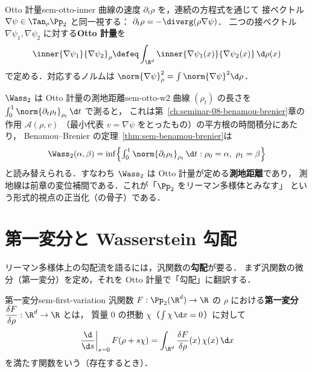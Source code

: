 \begin{definition}{Otto 計量}{sem-otto-inner}
  曲線の速度 $\partial_t\rho$ を，連続の方程式を通じて
  接ベクトル $\nabla\psi\in\Tan_\rho\Pp_2$ と同一視する：
  $\partial_t\rho=-\diverg(\rho\nabla\psi)$．
  二つの接ベクトル $\nabla\psi_1,\nabla\psi_2$ に対する\textbf{Otto 計量}を
  \[
    \inner{\nabla\psi_1}{\nabla\psi_2}_\rho
    \defeq
    \int_{\R^d}\inner{\nabla\psi_1(x)}{\nabla\psi_2(x)}\,\d\rho(x)
  \]
  で定める．対応するノルムは $\norm{\nabla\psi}_\rho^2=\int\norm{\nabla\psi}^2\d\rho$．
\end{definition}

\begin{remark}{$\Wass_2$ は Otto 計量の測地距離}{sem-otto-w2}
  曲線 $(\rho_t)$ の長さを $\int_0^1\norm{\partial_t\rho_t}_{\rho_t}\,\d t$ で測ると，
  これは第~\ref{ch:seminar-08-benamou-brenier}章の作用 $\mathcal{A}(\rho,v)$
  （最小代表 $v=\nabla\psi$ をとったもの）の平方根の時間積分にあたり，
  Benamou--Brenier の定理~\ref{thm:sem-benamou-brenier}は
  \[
    \Wass_2(\alpha,\beta)
    = \inf\Bigl\{\textstyle\int_0^1\norm{\partial_t\rho_t}_{\rho_t}\,\d t
      : \rho_0=\alpha,\ \rho_1=\beta\Bigr\}
  \]
  と読み替えられる．すなわち $\Wass_2$ は Otto 計量が定める\textbf{測地距離}であり，
  測地線は前章の変位補間である．これが「$\Pp_2$ をリーマン多様体とみなす」
  という形式的視点の正当化（の骨子）である．
\end{remark}

\section{第一変分と Wasserstein 勾配}
\label{sec:sem-w2-gradient}

リーマン多様体上の勾配流を語るには，汎関数の\textbf{勾配}が要る．
まず汎関数の微分（第一変分）を定め，それを Otto 計量で「勾配」に翻訳する．

\begin{definition}{第一変分}{sem-first-variation}
  汎関数 $F:\Pp_2(\R^d)\to\R$ の $\rho$ における\textbf{第一変分}
  $\dfrac{\delta F}{\delta\rho}:\R^d\to\R$ とは，
  質量 $0$ の摂動 $\chi$（$\int\chi\,\d x=0$）に対して
  \[
    \left.\frac{\d}{\d s}\right|_{s=0} F(\rho+s\chi)
    = \int_{\R^d} \frac{\delta F}{\delta\rho}(x)\,\chi(x)\,\d x
  \]
  を満たす関数をいう（存在するとき）．
\end{definition}

